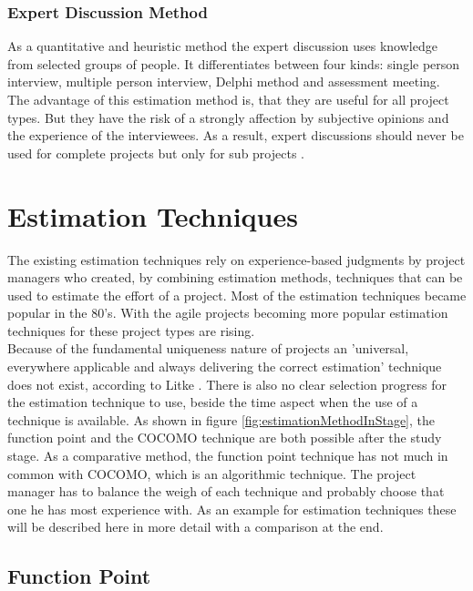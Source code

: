 \subsubsection{Expert Discussion Method}

As a quantitative and heuristic method the expert discussion uses knowledge from selected groups of people. It differentiates between four kinds: single person interview, multiple person interview, Delphi method and assessment meeting.\\
The advantage of this estimation method is, that they are useful for all project types. But they have the risk of a strongly affection by subjective opinions and the experience of the interviewees. As a result, expert discussions should never be used for complete projects but only for sub projects \cite{itplanung}.\\

\section{Estimation Techniques}

The existing estimation techniques rely on experience-based judgments by project managers
who created, by combining estimation methods, techniques that can be used to estimate the effort of a project. Most of the estimation techniques became popular in the 80's. With the agile projects becoming more popular estimation techniques for these project types are rising. \\
Because of the fundamental uniqueness nature of projects an 'universal, everywhere applicable and always delivering the correct estimation' technique does not exist, according to Litke \cite{litke}. There is also no clear selection progress for the estimation technique to use, beside the time aspect when the use of a technique is available. As shown in figure \ref{fig:estimationMethodInStage}, the function point and the COCOMO technique are both possible after the study stage. As a comparative method, the function point technique has not much in common with COCOMO, which is an algorithmic technique. The project manager has to balance the weigh of each technique and probably choose that one he has most experience with. As an example for estimation techniques these will be described here in more detail with a comparison at the end.


\subsection{Function Point} \label{FPMethod}

